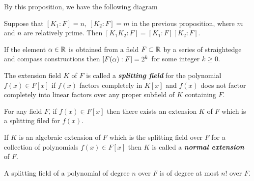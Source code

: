 By this proposition, we have the following diagram

\begin{center}
\end{center}

\nl

\begin{cor}
Suppose that $[K_1:F] = n,\ [K_2: F] = m$ in the previous proposition, where $m$ and $n$ are relatively prime. Then $[K_1K_2 : F] = [K_1:F][K_2:F]$.
\end{cor}

\nl

\begin{prop}
If the element $\alpha\in \mathbb{R}$ is obtained from a field $F\subset \mathbb{R}$ by a series of straightedge and compass constructions then $[F(\alpha) : F] = 2^k$ for some integer $k\geq 0$.
\end{prop}

\nl

\begin{defn}
The extension field $K$ of $F$ is called a \textit{\textbf{splitting field}} for the polynomial $f(x)\in F[x]$ if $f(x)$ factors completely in $K[x]$ and $f(x)$ does not factor completely into linear factors over any proper subfield of $K$ containing $F$.
\end{defn}

\nl

\begin{thm}
For any field $F$, if $f(x)\in F[x]$ then there exists an extension $K$ of $F$ which is a splitting filed for $f(x)$.
\end{thm}

\nl

\begin{defn}
If $K$ is an algebraic extension of $F$ which is the splitting field over $F$ for a collection of polynomials $f(x)\in F[x]$ then $K$ is called a \textit{\textbf{normal extension}} of $F$.
\end{defn}

\nl

\begin{prop}
A splitting field of a polynomial of degree $n$ over $F$ is of degree at most $n!$ over $F$.
\end{prop}

